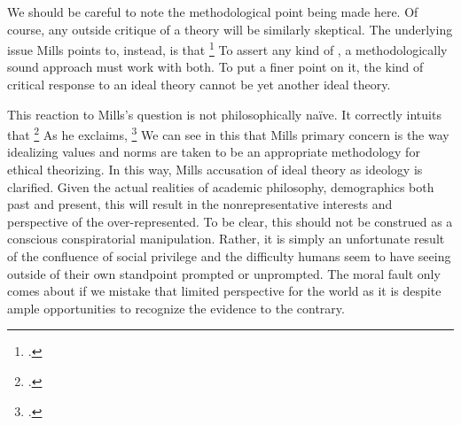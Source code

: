 \documentclass[letterpaper,notitlepage,12pt]{article}
\begin{document}
We should be careful to note the methodological point being made here.
Of course, any outside critique of a theory will be similarly skeptical.
The underlying issue Mills points to, instead, is that \footcite[p. 167]{mills_ideal_2005}
To assert any kind of , a methodologically sound approach must 
work with both.
To put a finer point on it, the kind of critical response to an ideal theory
cannot be yet another ideal theory.

This reaction to Mills's question is not philosophically na\"{i}ve.
It correctly intuits that \footcite[p.
170]{mills_ideal_2005}
As he exclaims, \footcite[p. 171]{mills_ideal_2005}
We can see in this that Mills primary concern is the way idealizing values and
norms are taken to be an appropriate methodology for ethical theorizing.
In this way, Mills accusation of ideal theory as ideology is clarified.
Given the actual realities of academic philosophy, demographics both past and
present, this will result in the nonrepresentative interests and perspective of
the over-represented.
To be clear, this should not be construed as a conscious conspiratorial
manipulation.
Rather, it is simply an unfortunate result of the confluence of social
privilege and the difficulty humans seem to have seeing outside of their own
standpoint prompted or unprompted.
The moral fault only comes about if we mistake that limited perspective for the
world as it is despite ample opportunities to recognize the evidence to the
contrary.
\end{document}
